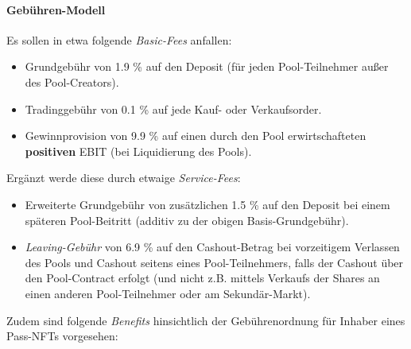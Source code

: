 
\paragraph{Gebühren-Modell}
\textbf{ }
\vspace{0.2cm}


\vspace{0.3cm}

\begin{Assumption}[Gebühren]\label{fees}

Es sollen in etwa folgende \textit{Basic-Fees} anfallen:

\begin{itemize}
	\item Grundgebühr von 1.9 \% auf den Deposit (für jeden Pool-Teilnehmer außer des Pool-Creators).
	\item Tradinggebühr von 0.1 \% auf jede Kauf- oder Verkaufsorder.
	\item Gewinnprovision von 9.9 \% auf einen durch den Pool erwirtschafteten \textbf{positiven} EBIT (bei Liquidierung des Pools).
\end{itemize}

\vspace{0.2cm}

Ergänzt werde diese durch etwaige \textit{Service-Fees}: 

\begin{itemize}
	\item Erweiterte Grundgebühr von zusätzlichen 1.5 \% auf den Deposit bei einem späteren Pool-Beitritt (additiv zu der obigen Basis-Grundgebühr).
	\item \textit{Leaving-Gebühr} von 6.9 \% auf den Cashout-Betrag bei vorzeitigem Verlassen des Pools und Cashout seitens eines Pool-Teilnehmers, falls der Cashout über den Pool-Contract erfolgt (und nicht z.B. mittels Verkaufs der Shares an einen anderen Pool-Teilnehmer oder am Sekundär-Markt).
\end{itemize}

\vspace{0.2cm}

Zudem sind folgende \textit{Benefits} hinsichtlich der Gebührenordnung für Inhaber eines Pass-NFTs  vorgesehen:


\end{Assumption}
